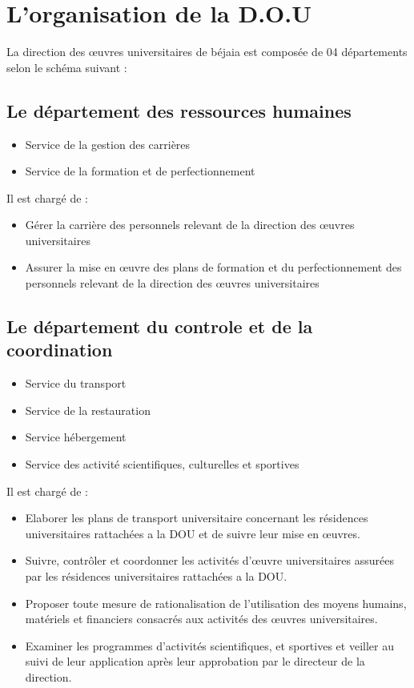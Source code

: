 \section{L’organisation de la D.O.U}
    La direction des œuvres universitaires de béjaia est composée de 04 départements selon le schéma suivant :

    \subsection{Le département des ressources humaines}
        \begin{itemize}
            \item Service de la gestion des carrières
            \item Service de la formation et de perfectionnement\\
        \end{itemize}

        Il est chargé de :
        \begin{itemize}\renewcommand{\labelitemi}{$\bullet$}
            \item Gérer la carrière des personnels relevant de la direction des œuvres universitaires
            \item Assurer la mise en œuvre des plans de formation et du perfectionnement des personnels relevant de la direction des œuvres universitaires
        \end{itemize}

    \subsection{Le département du controle et de la coordination}
        \begin{itemize}
            \item Service du transport
            \item Service de la restauration
            \item Service hébergement
            \item Service des activité scientifiques, culturelles et sportives\\
        \end{itemize}

        Il est chargé de :
        \begin{itemize}\renewcommand{\labelitemi}{$\bullet$}
            \item Elaborer les plans de transport universitaire concernant les résidences universitaires rattachées a la DOU et de suivre leur mise en œuvres.
            \item Suivre, contrôler et coordonner les activités d'œuvre universitaires assurées par les résidences universitaires rattachées a la DOU.
            \item Proposer toute mesure de rationalisation de l'utilisation des moyens humains, matériels et financiers consacrés aux activités des œuvres universitaires.
            \item Examiner les programmes d'activités scientifiques, et sportives et veiller  au suivi de leur application après leur approbation par le directeur de la direction.
        \end{itemize}

